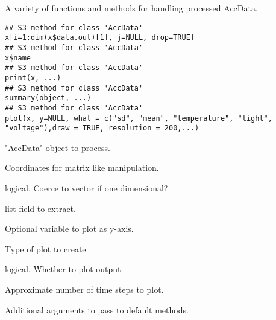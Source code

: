 \documentclass[a4paper]{book}
\begin{document}
\aliasA{[.AccData}{AccData}{[.AccData}
%
\begin{Description}\relax
A variety of functions and methods for handling processed AccData.
\end{Description}
%
\begin{Usage}
\begin{verbatim}
## S3 method for class 'AccData'
x[i=1:dim(x$data.out)[1], j=NULL, drop=TRUE]
## S3 method for class 'AccData'
x$name
## S3 method for class 'AccData'
print(x, ...)
## S3 method for class 'AccData'
summary(object, ...)
## S3 method for class 'AccData'
plot(x, y=NULL, what = c("sd", "mean", "temperature", "light", "voltage"),draw = TRUE, resolution = 200,...)
\end{verbatim}
\end{Usage}
%
\begin{Arguments}
\begin{ldescription}
\item[\code{x, object}] "AccData" object to process.
\item[\code{i,j}] Coordinates for matrix like manipulation.
\item[\code{drop}] logical. Coerce to vector if one dimensional?
\item[\code{name}] list field to extract.
\item[\code{y}] Optional variable to plot as y-axis.
\item[\code{what}] Type of plot to create.
\item[\code{draw}] logical. Whether to plot output.
\item[\code{resolution}] Approximate number of time steps to plot.
\item[\code{...}] Additional arguments to pass to default methods.
\end{ldescription}
\end{Arguments}
%
\end{document}
